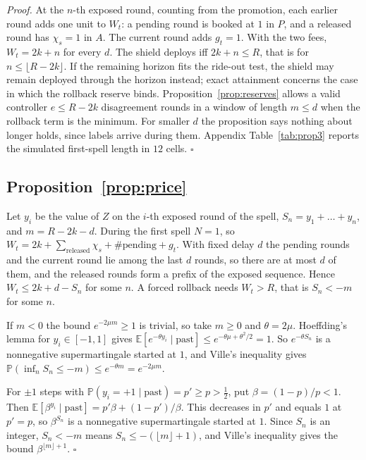 \documentclass[10pt]{article}
\theoremstyle{plain}
\theoremstyle{definition}
\newcommand{\PP}{\mathbb{P}}
\newcommand{\E}{\mathbb{E}}
\begin{document}
\emph{Proof.} At the $n$-th exposed round, counting from the promotion, each earlier round adds one unit to $W_t$: a pending round is booked at $1$ in $P$, and a released round has $\chi_s=1$ in $A$. The current round adds $g_t=1$. With the two fees, $W_t=2k+n$ for every $d$. The shield deploys iff $2k+n\le R$, that is for $n\le\lfloor R-2k\rfloor$. If the remaining horizon fits the ride-out test, the shield may remain deployed through the horizon instead; exact attainment concerns the case in which the rollback reserve binds. Proposition~\ref{prop:reserves} allows a valid controller $e\le R-2k$ disagreement rounds in a window of length $m\le d$ when the rollback term is the minimum. For smaller $d$ the proposition says nothing about longer holds, since labels arrive during them. Appendix Table~\ref{tab:prop3} reports the simulated first-spell length in $12$ cells. $\square$

\subsection{Proposition~\ref{prop:price}}
Let $y_i$ be the value of $Z$ on the $i$-th exposed round of the spell, $S_n=y_1+\dots+y_n$, and $m=R-2k-d$. During the first spell $N=1$, so $W_t=2k+\sum_{\text{released}}\chi_s+\#\text{pending}+g_t$. With fixed delay $d$ the pending rounds and the current round lie among the last $d$ rounds, so there are at most $d$ of them, and the released rounds form a prefix of the exposed sequence. Hence $W_t\le2k+d-S_n$ for some $n$. A forced rollback needs $W_t>R$, that is $S_n<-m$ for some $n$.

If $m<0$ the bound $e^{-2\mu m}\ge1$ is trivial, so take $m\ge0$ and $\theta=2\mu$. Hoeffding's lemma for $y_i\in[-1,1]$ gives $\E[e^{-\theta y_i}\mid\text{past}]\le e^{-\theta\mu+\theta^2/2}=1$. So $e^{-\theta S_n}$ is a nonnegative supermartingale started at $1$, and Ville's inequality gives $\PP(\inf_nS_n\le-m)\le e^{-\theta m}=e^{-2\mu m}$.

For $\pm1$ steps with $\PP(y_i=+1\mid\text{past})=p'\ge p>\tfrac12$, put $\beta=(1-p)/p<1$. Then $\E[\beta^{y_i}\mid\text{past}]=p'\beta+(1-p')/\beta$. This decreases in $p'$ and equals $1$ at $p'=p$, so $\beta^{S_n}$ is a nonnegative supermartingale started at $1$. Since $S_n$ is an integer, $S_n<-m$ means $S_n\le-(\lfloor m\rfloor+1)$, and Ville's inequality gives the bound $\beta^{\lfloor m\rfloor+1}$. $\square$
\end{document}
